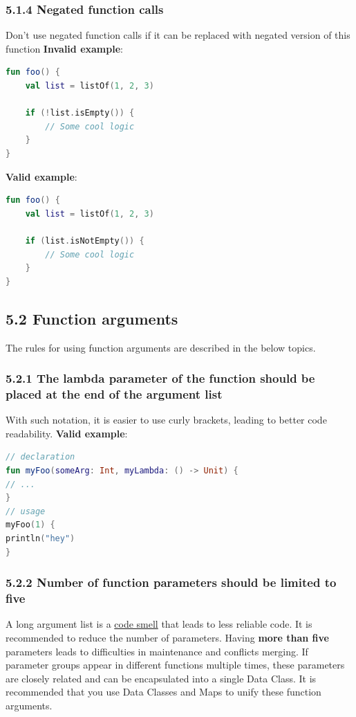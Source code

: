 \subsubsection*{\textbf{5.1.4 Negated function calls}}
\leavevmode\newline
\label{sec:5.1.4}
Don't use negated function calls if it can be replaced with negated version of this function
\textbf{Invalid example}:
\begin{lstlisting}[language=Kotlin]
fun foo() {
    val list = listOf(1, 2, 3)

    if (!list.isEmpty()) {
        // Some cool logic
    }
}
\end{lstlisting}
\textbf{Valid example}:
\begin{lstlisting}[language=Kotlin]
fun foo() {
    val list = listOf(1, 2, 3)

    if (list.isNotEmpty()) {
        // Some cool logic
    }
}
\end{lstlisting}
\subsection*{\textbf{5.2 Function arguments}}
\label{sec:5.2}
The rules for using function arguments are described in the below topics.
\subsubsection*{\textbf{5.2.1 The lambda parameter of the function should be placed at the end of the argument list}}
\leavevmode\newline
\label{sec:5.2.1}
With such notation, it is easier to use curly brackets, leading to better code readability.
\textbf{Valid example}:
\begin{lstlisting}[language=Kotlin]
// declaration
fun myFoo(someArg: Int, myLambda: () -> Unit) {
// ...
}
// usage
myFoo(1) {
println("hey")
}
\end{lstlisting}
\subsubsection*{\textbf{5.2.2 Number of function parameters should be limited to five}}
\leavevmode\newline
\label{sec:5.2.2}
A long argument list is a \href{https://en.wikipedia.org/wiki/Code\_smell}{code smell} that leads to less reliable code.
It is recommended to reduce the number of parameters. Having \textbf{more than five} parameters leads to difficulties in maintenance and conflicts merging.
If parameter groups appear in different functions multiple times, these parameters are closely related and can be encapsulated into a single Data Class.
It is recommended that you use Data Classes and Maps to unify these function arguments.
